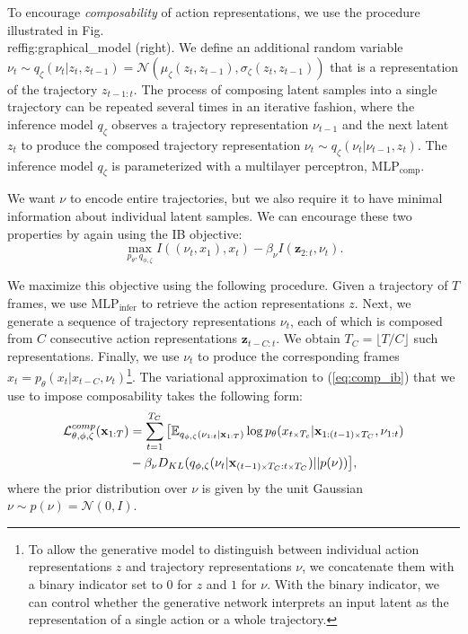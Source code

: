 \documentclass{article} %
\begin{document}
To encourage \textit{composability} of action representations, we use the procedure illustrated in Fig.\\ref{fig:graphical_model} (right). We define an additional random variable $\nu_t \sim q_\zeta(\nu_t | z_t, z_{t-1}) = \mathcal{N}(\mu_\zeta(z_t, z_{t-1}), \sigma_\zeta(z_t, z_{t-1}))$ that is a representation of the trajectory $z_{t-1:t}$. The process of composing latent samples into a single trajectory can be repeated several times in an iterative fashion, where the inference model $q_\zeta$ observes a trajectory representation $\nu_{t-1}$ and the next latent $z_t$ to produce the composed trajectory representation $\nu_t \sim q_\zeta(\nu_t | \nu_{t-1},z_t)$.  The inference model $q_\zeta$ is parameterized with a multilayer perceptron, $\text{MLP}_\text{comp}$. 


We want $\nu$ to encode entire trajectories, but we also require it to have minimal information about individual latent samples. We can encourage these two properties by again using the IB objective: 
\begin{equation} \max_{p_\theta,q_{\phi,\zeta}} I((\nu_t, x_1), x_t) - \beta_\nu  I(\mathbf{z}_{2:t}, \nu_t). 
\label{eq:comp_ib}
\end{equation}

We maximize this objective using the following procedure. Given a trajectory of $T$ frames, we use $\text{MLP}_\text{infer}$ to retrieve the action representations $z$. Next, we generate a sequence of trajectory representations $\nu_t$, each of which is composed from $C$ consecutive action representations $\mathbf{z}_{t-C:t}$. We obtain $T_C = \lfloor T/C \rfloor$ such representations.  Finally, we use $\nu_t$ to produce the corresponding frames $\hat{x}_t = p_{\theta}(x_t | x_{t-C}, \nu_t)$\footnote{To allow the generative model to distinguish between individual action representations $z$ and trajectory representations $\nu$, we concatenate them with a binary indicator set to $0$ for $z$ and $1$ for $\nu$. With the binary indicator, we can control whether the generative network interprets an input latent as the representation of a single action or a whole trajectory.}. The variational approximation to (\ref{eq:comp_ib}) that we use to impose composability takes the following form:
\begin{align}\begin{split}
\mathcal{L}^{comp}_{\theta,\phi,\zeta}(\mathbf{x}_{1:T}) & = \sum_{t=1}^{T_C} \big{[} \mathbb{E}_{q_{\phi, \zeta}(\mathbf{\nu}_{1:t} | \mathbf{x}_{1:T})} \log p_{\theta}(x_{t\text{\tiny$\times$} T_c} | \mathbf{x}_{1:(t-1)\text{\tiny$\times$} T_C}, \mathbf{\nu}_{1:t}) \\
& - \beta_\nu D_{KL}(q_{\phi,\zeta}(\nu_t | \mathbf{x}_{(t-1)\text{\tiny$\times$} T_C:t\text{\tiny$\times$} T_C}) || p(\nu))\big{]},
\end{split}\end{align}
where the prior distribution over $\nu$ is given by the unit Gaussian $\nu \sim p(\nu) = \mathcal{N}(0,I)$.
\end{document}
